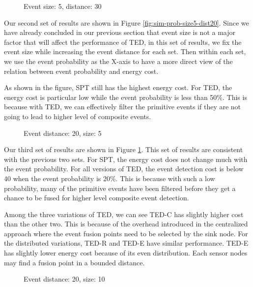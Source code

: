 \begin{figure}
\centering
{}
\caption{Event size: 5, distance: 30}
\label{fig:sim-prob-size5-dist30}
\end{figure}

Our second set of results are shown in Figure \ref{fig:sim-prob-size5-dist20}. Since we have already concluded in our previous section that event size is not a major factor that will affect the performance of TED, in this set of results, we fix the event size while increasing the event distance for each set. Then within each set, we use the event probability as the X-axis to have a more direct view of the relation between event probability and energy cost.

As shown in the figure, SPT still has the highest energy cost. For TED, the energy cost is particular low while the event probability is less than 50\%. This is because with TED, we can effectively filter the primitive events if they are not going to lead to higher level of composite events.

\begin{figure}
\centering
{}
\caption{Event distance: 20, size: 5}
\label{fig:sim-prob-dist20-size5}
\end{figure}

Our third set of results are shown in Figure \ref{fig:sim-prob-size5-dist30}. This set of results are consistent with the previous two sets. For SPT, the energy cost does not change much with the event probability. For all versions of TED, the event detection cost is below 40 when the event probability is 20\%. This is because with such a low probability, many of the primitive events have been filtered before they get a chance to be fused for higher level composite event detection.

Among the three variations of TED, we can see TED-C has slightly higher cost than the other two. This is because of the overhead introduced in the centralized approach where the event fusion points need to be selected by the sink node. For the distributed variations, TED-R and TED-E have similar performance. TED-E has slightly lower energy cost because of its even distribution. Each sensor nodes may find a fusion point in a bounded distance.

\begin{figure}
\centering
{}
\caption{Event distance: 20, size: 10}
\label{fig:sim-prob-dist20-size10}
\end{figure}

